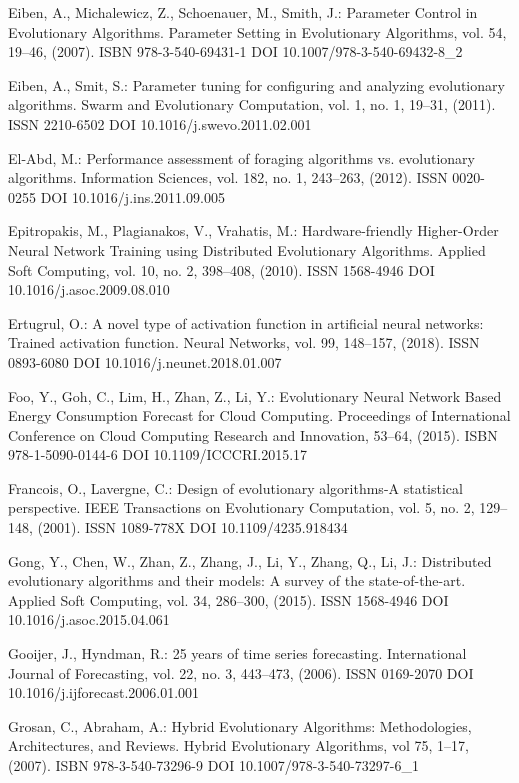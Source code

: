 \begin{thebibliography}{99.}
 Eiben, A., Michalewicz, Z., Schoenauer, M., Smith, J.: Parameter Control in Evolutionary Algorithms. Parameter Setting in Evolutionary Algorithms, vol. 54, 19--46, (2007). ISBN 978-3-540-69431-1 DOI 10.1007/978-3-540-69432-8\_2

 Eiben, A., Smit, S.: Parameter tuning for configuring and analyzing evolutionary algorithms. Swarm and Evolutionary Computation, vol. 1, no. 1, 19--31, (2011). ISSN 2210-6502 DOI 10.1016/j.swevo.2011.02.001

 El-Abd, M.: Performance assessment of foraging algorithms vs. evolutionary algorithms. Information Sciences, vol. 182, no. 1, 243--263, (2012). ISSN 0020-0255 DOI 10.1016/j.ins.2011.09.005

 Epitropakis, M., Plagianakos, V., Vrahatis, M.: Hardware-friendly Higher-Order Neural Network Training using Distributed Evolutionary Algorithms. Applied Soft Computing, vol. 10, no. 2, 398--408, (2010). ISSN 1568-4946 DOI 10.1016/j.asoc.2009.08.010

 Ertugrul, O.: A novel type of activation function in artificial neural networks: Trained activation function. Neural Networks, vol. 99, 148--157, (2018). ISSN 0893-6080 DOI 10.1016/j.neunet.2018.01.007

 Foo, Y., Goh, C., Lim, H., Zhan, Z., Li, Y.: Evolutionary Neural Network Based Energy Consumption Forecast for Cloud Computing. Proceedings of International Conference on Cloud Computing Research and Innovation, 53--64, (2015). ISBN 978-1-5090-0144-6 DOI 10.1109/ICCCRI.2015.17

 Francois, O., Lavergne, C.: Design of evolutionary algorithms-A statistical perspective. IEEE Transactions on Evolutionary Computation, vol. 5, no. 2, 129--148, (2001). ISSN 1089-778X DOI 10.1109/4235.918434

 Gong, Y., Chen, W., Zhan, Z., Zhang, J., Li, Y., Zhang, Q., Li, J.: Distributed evolutionary algorithms and their models: A survey of the state-of-the-art. Applied Soft Computing, vol. 34, 286--300, (2015). ISSN 1568-4946 DOI 10.1016/j.asoc.2015.04.061

 Gooijer, J., Hyndman, R.: 25 years of time series forecasting. International Journal of Forecasting, vol. 22, no. 3, 443--473, (2006). ISSN 0169-2070 DOI 10.1016/j.ijforecast.2006.01.001

 Grosan, C., Abraham, A.: Hybrid Evolutionary Algorithms: Methodologies, Architectures, and Reviews. Hybrid Evolutionary Algorithms, vol 75, 1--17, (2007). ISBN 978-3-540-73296-9 DOI 10.1007/978-3-540-73297-6\_1


\end{thebibliography}
